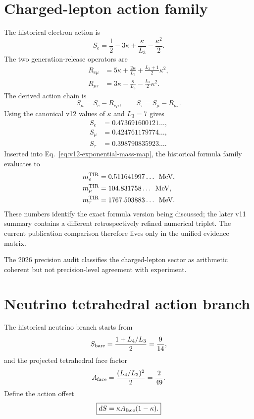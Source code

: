 \section{Charged-lepton action family}
The historical electron action is
\begin{equation}
\boxed{
S_e
=\frac12-3\kappa+\frac{\kappa}{L_3}-\frac{\kappa^2}{2}.
}
\label{eq:v12-electron-action}
\end{equation}
The two generation-release operators are
\begin{align}
R_{e\mu}
&=5\kappa+\frac{2\kappa}{L_3}+\frac{L_3+1}{2}\kappa^2,
\label{eq:v12-electron-muon-release}\\
R_{\mu\tau}
&=3\kappa-\frac{\kappa}{L_3}-\frac{L_3}{2}\kappa^2.
\label{eq:v12-muon-tau-release}
\end{align}
The derived action chain is
\begin{equation}
\boxed{
S_\mu=S_e-R_{e\mu},
\qquad
S_\tau=S_\mu-R_{\mu\tau}.
}
\label{eq:v12-charged-lepton-actions}
\end{equation}
Using the canonical v12 values of $\kappa$ and $L_3=7$ gives
\begin{align}
S_e&=0.473691600121\ldots,\\
S_\mu&=0.424761179774\ldots,\\
S_\tau&=0.398790835923\ldots .
\end{align}
Inserted into Eq.~\eqref{eq:v12-exponential-mass-map}, the historical formula
family evaluates to
\begin{align}
m_e^{\rm TIR}&=0.511641997\ldots\ \,\text{MeV},\\
m_\mu^{\rm TIR}&=104.831758\ldots\ \,\text{MeV},\\
m_\tau^{\rm TIR}&=1767.503883\ldots\ \,\text{MeV}.
\end{align}
These numbers identify the exact formula version being discussed; the later
v11 summary contains a different retrospectively refined numerical triplet.
The current publication comparison therefore lives only in the unified evidence
matrix.

The 2026 precision audit classifies the charged-lepton sector as arithmetic
coherent but not precision-level agreement with experiment.

\section{Neutrino tetrahedral action branch}
The historical neutrino branch starts from
\begin{equation}
S_{\rm bare}
=\frac{1+L_4/L_3}{2}
=\frac9{14},
\label{eq:v12-neutrino-bare-action}
\end{equation}
and the projected tetrahedral face factor
\begin{equation}
A_{\rm face}
=\frac{(L_4/L_3)^2}{2}
=\frac2{49}.
\label{eq:v12-neutrino-face-area}
\end{equation}
Define the action offset
\begin{equation}
\boxed{
dS
=\kappa A_{\rm face}(1-\kappa).
}
\label{eq:v12-neutrino-offset}
\end{equation}

